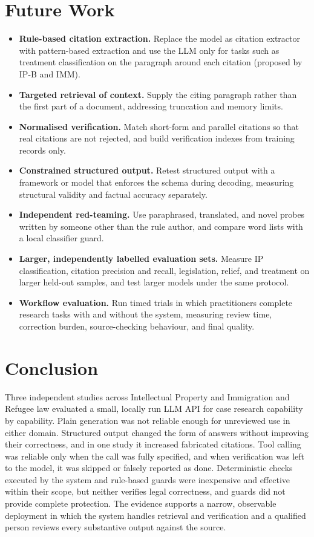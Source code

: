 \documentclass[10pt,letterpaper]{article}
\begin{document}
\section{Future Work}
\begin{itemize}
\item \textbf{Rule-based citation extraction.} Replace the model as citation extractor with pattern-based extraction and use the LLM only for tasks such as treatment classification on the paragraph around each citation (proposed by IP-B and IMM).
\item \textbf{Targeted retrieval of context.} Supply the citing paragraph rather than the first part of a document, addressing truncation and memory limits.
\item \textbf{Normalised verification.} Match short-form and parallel citations so that real citations are not rejected, and build verification indexes from training records only.
\item \textbf{Constrained structured output.} Retest structured output with a framework or model that enforces the schema during decoding, measuring structural validity and factual accuracy separately.
\item \textbf{Independent red-teaming.} Use paraphrased, translated, and novel probes written by someone other than the rule author, and compare word lists with a local classifier guard.
\item \textbf{Larger, independently labelled evaluation sets.} Measure IP classification, citation precision and recall, legislation, relief, and treatment on larger held-out samples, and test larger models under the same protocol.
\item \textbf{Workflow evaluation.} Run timed trials in which practitioners complete research tasks with and without the system, measuring review time, correction burden, source-checking behaviour, and final quality.
\end{itemize}

\section{Conclusion}
Three independent studies across Intellectual Property and Immigration and Refugee law evaluated a small, locally run LLM API for case research capability by capability. Plain generation was not reliable enough for unreviewed use in either domain. Structured output changed the form of answers without improving their correctness, and in one study it increased fabricated citations. Tool calling was reliable only when the call was fully specified, and when verification was left to the model, it was skipped or falsely reported as done. Deterministic checks executed by the system and rule-based guards were inexpensive and effective within their scope, but neither verifies legal correctness, and guards did not provide complete protection. The evidence supports a narrow, observable deployment in which the system handles retrieval and verification and a qualified person reviews every substantive output against the source.
\end{document}
